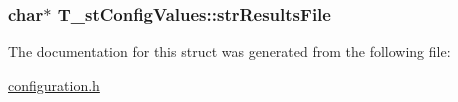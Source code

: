 \hypertarget{structT__stConfigValues_a1d061110525c304ae6caa537fa72c263}{
\subsubsection[{str\-Results\-File}]{\setlength{\rightskip}{0pt plus 5cm}char$\ast$ T\-\_\-st\-Config\-Values\-::str\-Results\-File}}\label{structT__stConfigValues_a1d061110525c304ae6caa537fa72c263}


The documentation for this struct was generated from the following file\-:\begin{DoxyCompactItemize}
\item 
\hyperlink{configuration_8h}{configuration.\-h}\end{DoxyCompactItemize}
